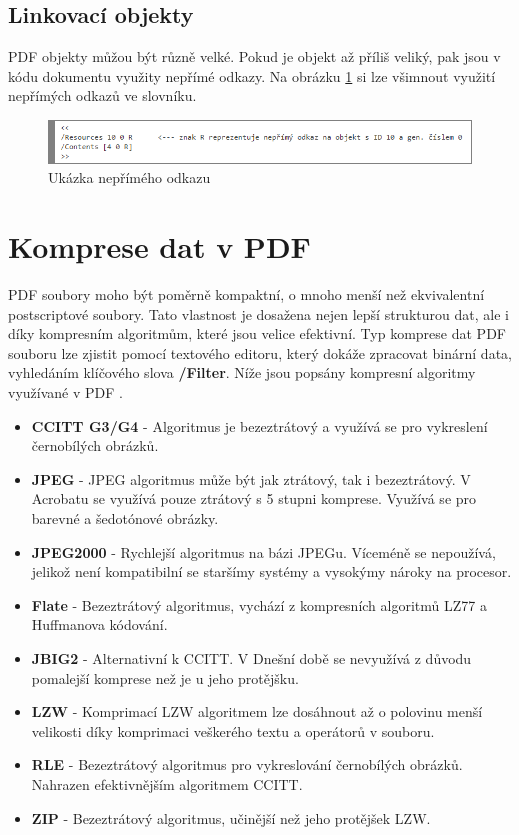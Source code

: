 \subsection{Linkovací objekty}
PDF objekty můžou být různě velké. Pokud je objekt až příliš veliký, pak jsou v kódu dokumentu využity nepřímé odkazy. Na obrázku \ref{fig:indirect_reference} si lze všimnout využití nepřímých odkazů ve slovníku. 
	\begin{figure}[h!]
	\centering
	\includegraphics[width=12cm]{img/pdf_indirect_reference}
	\caption{Ukázka nepřímého odkazu}
	\label{fig:indirect_reference}
	\end{figure}

\section{Komprese dat v PDF}
\label{komprese}
PDF soubory moho být poměrně kompaktní, o mnoho menší než ekvivalentní postscriptové soubory. Tato vlastnost je dosažena nejen lepší strukturou dat, ale i díky kompresním algoritmům, které jsou velice efektivní. Typ komprese dat PDF souboru lze zjistit pomocí textového editoru, který dokáže zpracovat binární data, vyhledáním klíčového slova \textbf{/Filter}. Níže jsou popsány kompresní algoritmy využívané v PDF \cite{PDFPrepressure}.
\begin{itemize}
	\item \textbf{CCITT G3/G4} - Algoritmus je bezeztrátový a využívá se pro vykreslení černobílých obrázků.
	\item \textbf{JPEG} - JPEG algoritmus může být jak ztrátový, tak i bezeztrátový. V Acrobatu se využívá pouze ztrátový s 5 stupni komprese. Využívá se pro barevné a šedotónové obrázky.
	\item \textbf{JPEG2000} - Rychlejší algoritmus na bázi JPEGu. Víceméně se nepoužívá, jelikož není kompatibilní se staršímy systémy a vysokýmy nároky na procesor.
	\item \textbf{Flate} - Bezeztrátový algoritmus, vychází z kompresních algoritmů LZ77 a Huffmanova kódování.
	\item \textbf{JBIG2} - Alternativní k CCITT. V Dnešní době se nevyužívá z důvodu pomalejší komprese než je u jeho protějšku.
	\item \textbf{LZW} - Komprimací LZW algoritmem lze dosáhnout až o polovinu menší velikosti díky komprimaci veškerého textu a operátorů v souboru.
	\item \textbf{RLE} - Bezeztrátový algoritmus pro vykreslování černobílých obrázků. Nahrazen efektivnějším algoritmem CCITT.
	\item \textbf{ZIP} - Bezeztrátový algoritmus, učinější než jeho protějšek LZW.
\end{itemize}

